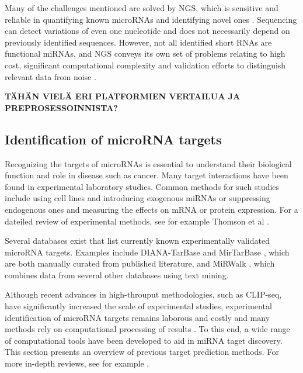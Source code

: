Many of the challenges mentioned are solved by NGS, which is sensitive and
reliable in quantifying known microRNAs and identifying novel ones
\citep{Huang2011}. Sequencing can detect variations of even one nucleotide and
does not necessarily depend on previously identified sequences. However, not
all identified short RNAs are functional miRNAs, and NGS conveys its own set
of problems relating to high cost, significant computational complexity and
validation efforts to distinguish relevant data from noise
\citep{Chugh2012,Hunt2015}.

\textbf{TÄHÄN VIELÄ ERI PLATFORMIEN VERTAILUA JA PREPROSESSOINNISTA?}





\subsection{Identification of microRNA targets}




Recognizing the targets of microRNAs is essential to understand their
biological function and role in disease such as cancer. Many target
interactions have been found in experimental laboratory studies. Common
methods for such studies include using cell lines and introducing exogenous
miRNAs or suppressing endogenous ones and measuring the effects on mRNA or
protein expression. For a dateiled review of experimental methods, see for
example Thomson et al \citep{Thomson2011}.

Several databases exist that list currently known experimentally validated
microRNA targets. Examples include DIANA-TarBase \citep{Vlachos2015} and
MirTarBase \citep{Chou2016}, which are both manually curated from published
literature, and MiRWalk \citep{Dweep2015}, which combines data from several
other databases using text mining.

Although recent advances in high-throuput methodologies, such as CLIP-seq,
have significantly increased the scale of experimental studies, experimental
identification of microRNA targets remains laborous and costly and many
methods rely on computational processing of results \citep{Vlachos2015}. To
this end, a wide range of computational tools have been developed to aid in
miRNA taget discovery. This section presents an overview of previous target
prediction methods. For more in-depth reviews, see for example
\citep{Yeu2009,Muniategui2012}.




